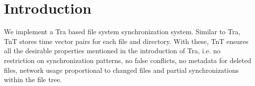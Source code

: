 \section {Introduction}
We implement a Tra based file system synchronization system.  Similar to Tra, TnT stores time vector pairs for each file and directory.  With these, TnT ensures all the desirable properties mentioned in the introduction of Tra, i.e. no restriction on synchronization patterns, no false conflicts, no metadata for deleted files, network usage proportional to changed files and partial synchronizations within the file tree.  
